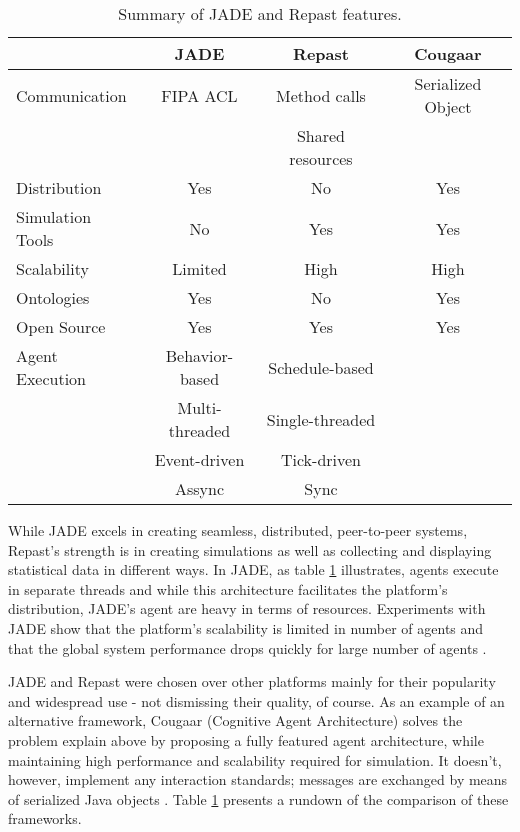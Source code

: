 \begin{table}[tb]
	\caption{Summary of JADE and Repast features.}
	\label{tab:jadevsrep}
	\begin{center}
		\begin{tabular}{l|ccc}
		\hline

		\hline
		\textbf{} & \textbf{JADE} & \textbf{Repast} & \textbf{Cougaar} \\
		\hline
			Communication & FIPA ACL &  Method calls  & Serialized Object \\
						  &			 &  Shared resources \\
		\hline
			Distribution & Yes & No & Yes \\
		\hline
			Simulation Tools & No & Yes & Yes \\
		\hline
			Scalability & Limited & High & High \\
		\hline
			Ontologies & Yes & No & Yes\\
		\hline
			Open Source & Yes & Yes & Yes\\
		\hline
			Agent Execution & Behavior-based & Schedule-based  &  \\
							& Multi-threaded & Single-threaded &  \\
							& Event-driven   & Tick-driven 	   &  \\
							& Assync		 & Sync 		   &  \\
		\hline
		\end{tabular}
	\end{center}
\end{table}

While JADE excels in creating seamless, distributed, peer-to-peer systems,
Repast's strength is in creating simulations as well as collecting and displaying statistical data in different ways. In JADE, as table \ref{tab:jadevsrep} illustrates, agents execute in separate threads and while this architecture facilitates the platform's distribution, JADE's agent are heavy in terms of resources. Experiments with JADE show that the platform's scalability is limited in number of agents and that the global system performance drops quickly for large number of agents \cite{mengistu2008scalability} \cite{garcia2011misia}.

JADE and Repast were chosen over other platforms mainly for their popularity and widespread use - not dismissing their quality, of course. As an example of an alternative framework, Cougaar (Cognitive Agent Architecture) solves the problem explain above by proposing a fully featured agent architecture, while maintaining high performance and scalability required for simulation. It doesn't, however, implement any interaction standards; messages are exchanged by means of serialized Java objects \cite{helsinger2004cougaar}. Table \ref{tab:jadevsrep} presents a rundown of the comparison of these frameworks.

